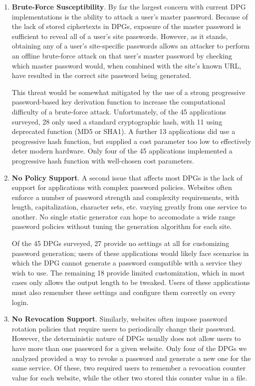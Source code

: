 \begin{enumerate}[leftmargin=*]
    \itemsep 1em
    \item \textbf{Brute-Force Susceptibility}. By far the largest concern with current DPG implementations is the ability to attack a user's master password. Because of the lack of stored ciphertexts in DPGs, exposure of the master password is sufficient to reveal all of a user's site passwords.    
    However, as it stands, obtaining any of a user's site-specific passwords allows an attacker to perform an offline brute-force attack on that user's master password by checking which master password would, when combined with the site's known URL, have resulted in the correct site password being generated.
    
    \medskip
    
    This threat would be somewhat mitigated by the use of a strong progressive password-based key derivation function to increase the computational difficulty of a brute-force attack. Unfortunately, of the 45 applications surveyed, 28 only used a standard cryptographic hash, with 11 using deprecated function (MD5 or SHA1). A further 13 applications did use a progressive hash function, but supplied a cost parameter too low to effectively deter modern hardware. Only four of the 45 applications implemented a progressive hash function with well-chosen cost parameters.
    
    \item \textbf{No Policy Support}. A second issue that affects most DPGs is the lack of support for applications with complex password policies.
    Websites often enforce a number of password strength and complexity requirements, with length, capitalization, character sets, etc. varying greatly from one service to another. No single static generator can hope to accomodate a wide range password policies without tuning the generation algorithm for each site.
    
    \medskip
    
    Of the 45 DPGs surveyed, 27 provide no settings at all for customizing password generation; users of these applications would likely face scenarios in which the DPG cannot generate a password compatible with a service they wish to use. The remaining 18 provide limited customization, which in most cases only allows the output length to be tweaked. Users of these applications must also remember these settings and configure them correctly on every login.
    
    \item \textbf{No Revocation Support}. Similarly, websites often impose password rotation policies that require users to periodically change their password. However, the deterministic nature of DPGs usually does not allow users to have more than one password for a given website. Only four of the DPGs we analyzed provided a way to revoke a password and generate a new one for the same service. Of these, two required users to remember a revocation counter value for each website, while the other two stored this counter value in a file. 
    

\end{enumerate}
